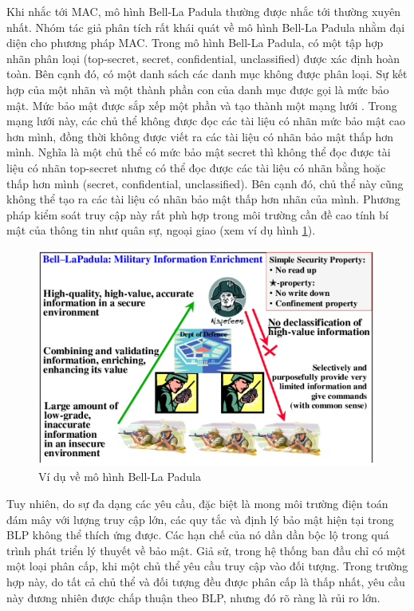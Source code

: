 Khi nhắc tới MAC, mô hình Bell-La Padula  thường được nhắc tới thường xuyên nhất. Nhóm tác giả phân tích rất khái quát về mô hình Bell-La Padula nhằm đại
diện cho phương pháp MAC. Trong mô hình Bell-La Padula, có một tập hợp nhãn phân loại (top-secret, secret,
confidential, unclassified) được xác định hoàn toàn. Bên cạnh đó, có một danh sách các
danh mục không được phân loại. Sự kết hợp của một nhãn và một thành phần con của
danh mục được gọi là mức bảo mật. Mức bảo mật được sắp xếp một phần và tạo thành
một mạng lưới . Trong mạng lưới này, các chủ thể không được đọc các tài liệu có nhãn mức bảo
mật cao hơn mình, đồng thời không được viết ra các tài liệu có nhãn bảo mật thấp hơn
mình. Nghĩa là một chủ thể có mức bảo mật secret thì không thể đọc được tài liệu có
nhãn top-secret nhưng có thể đọc được các tài liệu có nhãn bằng hoặc thấp hơn mình
(secret, confidential, unclassified). Bên cạnh đó, chủ thể này cũng không thể tạo ra các
tài liệu có nhãn bảo mật thấp hơn nhãn của mình. Phương pháp kiểm soát truy cập này rất phù hợp trong môi trường cần đề cao tính bí mật của thông tin như quân sự, ngoại
giao (xem ví dụ hình \ref{fig:chap2-blp-model}). \\
\begin{figure}
    \centering
    \includegraphics[scale=0.6]{graphics/chapter-2/chap2-blp-model.png}
    \caption{Ví dụ về mô hình Bell-La Padula}
    \label{fig:chap2-blp-model}
\end{figure}

Tuy nhiên, do sự đa dạng các yêu cầu, đặc biệt là mong môi trường điện toán đám
mây với lượng truy cập lớn, các quy tắc và định lý bảo mật hiện tại trong BLP không thể
thích ứng được.  Các hạn chế của nó dần dần bộc lộ trong quá trình phát triển lý
thuyết về bảo mật.
Giả sử, trong hệ thống ban đầu chỉ có một một loại phân cấp, khi một chủ thể yêu
cầu truy cập vào đối tượng. Trong trường hợp này, do tất cả chủ thể và đối tượng đều
được phân cấp là thấp nhất, yêu cầu này đương nhiên được chấp thuận theo BLP, nhưng
đó rõ ràng là rủi ro lớn. 

